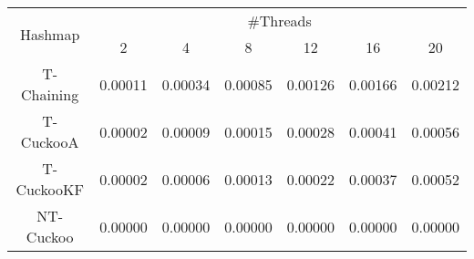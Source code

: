 \begin{tabular}{|c|c|c|c|c|c|c|}
\hline
\multirow{2}{*}{Hashmap} & \multicolumn{6}{c|}{\#Threads}\\\cline{2-7}& 2 & 4 & 8 & 12 & 16 & 20\\
\hline
\hline
T-Chaining & 0.00011 & 0.00034 & 0.00085 & 0.00126 & 0.00166 & 0.00212\\
T-CuckooA & 0.00002 & 0.00009 & 0.00015 & 0.00028 & 0.00041 & 0.00056\\
T-CuckooKF & 0.00002 & 0.00006 & 0.00013 & 0.00022 & 0.00037 & 0.00052\\
NT-Cuckoo & 0.00000 & 0.00000 & 0.00000 & 0.00000 & 0.00000 & 0.00000\\
\hline
\end{tabular}
